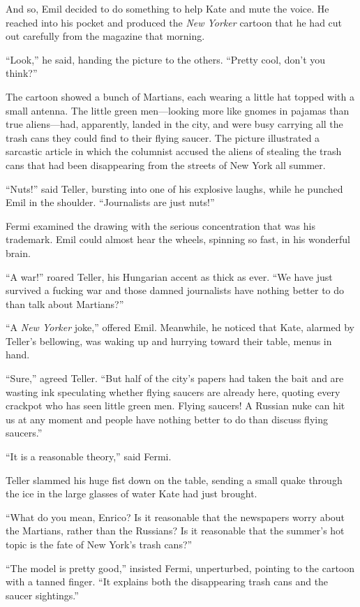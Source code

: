 \documentclass[11pt,a4paper]{article}
\begin{document}
And so, Emil decided to do something to help Kate and mute the voice. He reached into his pocket and produced the \emph{New Yorker} cartoon that he had cut out carefully from the magazine that morning.

“Look,” he said, handing the picture to the others. “Pretty cool, don’t you think?”

The cartoon showed a bunch of Martians, each wearing a little hat topped with a small antenna. The little green men---looking more like gnomes in pajamas than true aliens---had, apparently, landed in the city, and were busy carrying all the trash cans they could find to their flying saucer. The picture illustrated a sarcastic article in which the columnist accused the aliens of stealing the trash cans that had been disappearing from the streets of New York all summer.

“Nuts!” said Teller, bursting into one of his explosive laughs, while he punched Emil in the shoulder. “Journalists are just nuts!”

Fermi examined the drawing with the serious concentration that was his trademark. Emil could almost hear the wheels, spinning so fast, in his wonderful brain.

“A war!” roared Teller, his Hungarian accent as thick as ever. “We have just survived a fucking war and those damned journalists have nothing better to do than talk about Martians?”

“A \emph{New Yorker} joke,” offered Emil. Meanwhile, he noticed that Kate, alarmed by Teller’s bellowing, was waking up and hurrying toward their table, menus in hand.

“Sure,” agreed Teller. “But half of the city’s papers had taken the bait and are wasting ink speculating whether flying saucers are already here, quoting every crackpot who has seen little green men. Flying saucers! A Russian nuke can hit us at any moment and people have nothing better to do than discuss flying saucers.”

“It is a reasonable theory,” said Fermi.

Teller slammed his huge fist down on the table, sending a small quake through the ice in the large glasses of water Kate had just brought.

“What do you mean, Enrico? Is it reasonable that the newspapers worry about the Martians, rather than the Russians? Is it reasonable that the summer’s hot topic is the fate of New York’s trash cans?”

“The model is pretty good,” insisted Fermi, unperturbed, pointing to the cartoon with a tanned finger. “It explains both the disappearing trash cans and the saucer sightings.”
\end{document}
